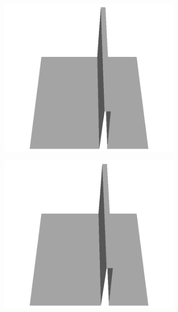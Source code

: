 \documentclass[../document.tex]{subfiles}
\begin{document}
\begin{figure}[H]
\begin{subfigure}[b]{0.065\textwidth}
    \end{subfigure}
    \begin{subfigure}[b]{0.065\textwidth}
    \includegraphics[width=\linewidth]{../img/5/custom_patches/walls_front/all/53-3d.png}
    \end{subfigure}
    \begin{subfigure}[b]{0.065\textwidth}
    \includegraphics[width=\linewidth]{../img/5/custom_patches/walls_front/all/52-3d.png}
    \end{subfigure}

\end{figure}
\end{document}
